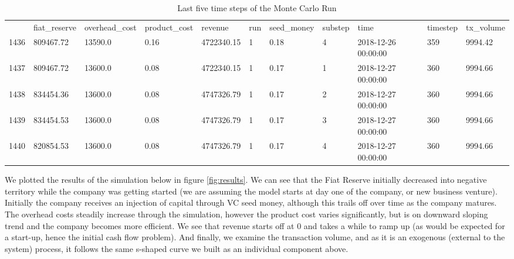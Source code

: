 \documentclass[12pt]{extarticle}
\begin{document}
\begin{table}[h]
	\centering
	\begin{adjustbox}{max width=\textwidth}
	\begin{tabular}{lllllllllll}
		\toprule
		& fiat\_reserve & overhead\_cost & product\_cost & revenue    & run & seed\_money & substep & time                & timestep & tx\_volume \\
		1436 & 809467.72     & 13590.0        & 0.16          & 4722340.15 & 1   & 0.18        & 4       & 2018-12-26 00:00:00 & 359      & 9994.42    \\
		1437 & 809467.72     & 13600.0        & 0.08          & 4722340.15 & 1   & 0.17        & 1       & 2018-12-27 00:00:00 & 360      & 9994.66    \\
		1438 & 834454.36     & 13600.0        & 0.08          & 4747326.79 & 1   & 0.17        & 2       & 2018-12-27 00:00:00 & 360      & 9994.66    \\
		1439 & 834454.53     & 13600.0        & 0.08          & 4747326.79 & 1   & 0.17        & 3       & 2018-12-27 00:00:00 & 360      & 9994.66    \\
		1440 & 820854.53     & 13600.0        & 0.08          & 4747326.79 & 1   & 0.17        & 4       & 2018-12-27 00:00:00 & 360      & 9994.66 \\ \bottomrule
	\end{tabular}
\end{adjustbox}
\caption{Last five time steps of the Monte Carlo Run}
\label{table:LastFive}
\end{table}

We plotted the results of the simulation below in figure \ref{fig:results}. We can see that the Fiat Reserve initially decreased into negative territory while the company was getting started (we are assuming the model starts at day one of the company, or new business venture). Initially the company receives an injection of capital through VC seed money, although this trails off over time as the company matures. The overhead costs steadily increase through the simulation, however the product cost varies significantly, but is on downward sloping trend and the company becomes more efficient. We see that revenue starts off at 0 and takes a while to ramp up (as would be expected for a start-up, hence the initial cash flow problem). And finally, we examine the transaction volume, and as it is an exogenous (external to the system) process, it follows the same s-shaped curve we built as an individual component above. 
\newpage
\end{document}

